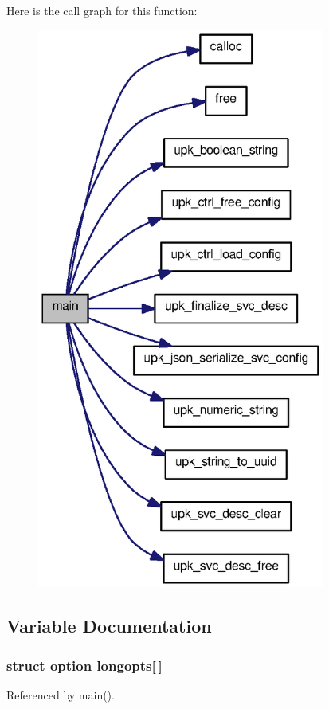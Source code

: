 Here is the call graph for this function:
\nopagebreak
\begin{figure}[H]
\begin{center}
\leavevmode
\includegraphics[width=268pt]{upk_8c_a647f21a28344e1d9c643f4115516d7c9_cgraph}
\end{center}
\end{figure}




\subsection{Variable Documentation}
\subsubsection[{longopts}]{\setlength{\rightskip}{0pt plus 5cm}struct option {\bf longopts}[$\,$]\hspace{0.3cm}{\ttfamily  [static]}}\label{upk_8c_a94965649155359a4c4eb047af782bf22}


Referenced by main().


